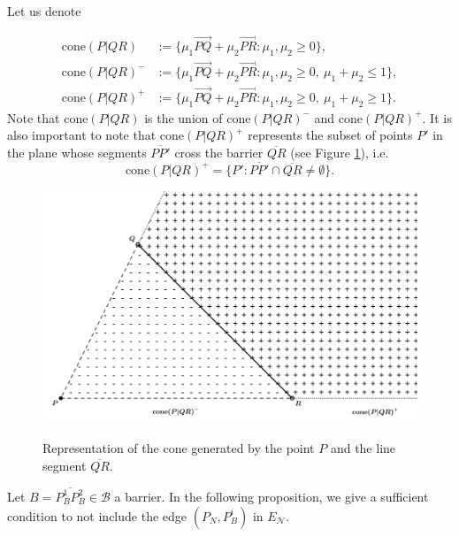 \documentclass[a4paper,  review, authoryear, 1p.]{elsarticle}
\newcommand{\EN}{{E^{}_{\mathcal N}}}
\newcommand{\segment}[2]{\overline{#1#2}}
\begin{document}
	Let us denote
	
	\begin{align*}
		\text{cone}(P|QR)&:=\{\mu_1 \overrightarrow{PQ}+\mu_2\overrightarrow{PR}:\mu_1,\mu_2\geq 0\},\\
		\text{cone}(P|QR)^-&:=\{\mu_1 \overrightarrow{PQ}+\mu_2\overrightarrow{PR}:\mu_1,\mu_2\geq 0,\:\mu_1+\mu_2\leq 1\},\\
		\text{cone}(P|QR)^+&:=\{\mu_1 \overrightarrow{PQ}+\mu_2\overrightarrow{PR}:\mu_1,\mu_2\geq 0,\:\mu_1+\mu_2\geq 1\}.
	\end{align*}
	Note that $\text{cone}(P|QR)$ is the union of $\text{cone}(P|QR)^-$ and $\text{cone}(P|QR)^+$. It is also important to note that $\text{cone}(P|QR)^+$ represents the subset of points $P'$ in the plane whose segments $\segment{P}{P'}$ cross the barrier $\overline{QR}$ (see Figure \ref{fig:cones}), i.e.
	$$\text{cone}(P|QR)^+=\{P':\overline{PP'}\cap\overline{QR}\neq\emptyset\}.$$
	
	\begin{figure}[h!]
		\caption{Representation of the cone generated by the point $P$ and the line segment $\segment{Q}{R}$.}
		\centering
		\includegraphics[width=0.75\linewidth]{figures/cones}
		\label{fig:cones}
	\end{figure}
	Let $B = \overline{P^1_BP^2_B}\in\mathcal B$ a barrier. In the following proposition, we give a sufficient condition to not include the edge $(P^{}_N, P^i_B)$ in $\EN$.
	
\end{document}
